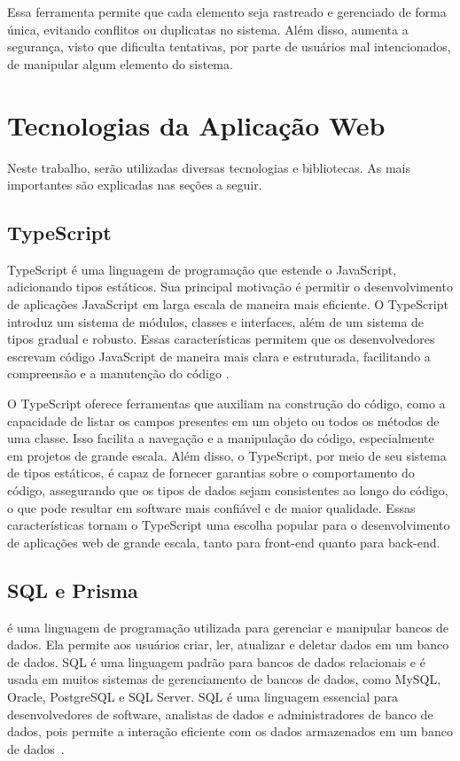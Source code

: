 Essa ferramenta permite que cada elemento seja rastreado e gerenciado de forma única, evitando conflitos ou duplicatas no sistema. Além disso, aumenta a segurança, visto que dificulta tentativas, por parte de usuários mal intencionados, de manipular algum elemento do sistema.

\section{Tecnologias da Aplicação Web}

Neste trabalho, serão utilizadas diversas tecnologias e bibliotecas. As mais importantes são explicadas nas seções a seguir. 

\subsection{TypeScript}

TypeScript é uma linguagem de programação que estende o JavaScript, adicionando tipos estáticos. Sua principal motivação é permitir o desenvolvimento de aplicações JavaScript em larga escala de maneira mais eficiente. O TypeScript introduz um sistema de módulos, classes e interfaces, além de um sistema de tipos gradual e robusto. Essas características permitem que os desenvolvedores escrevam código JavaScript de maneira mais clara e estruturada, facilitando a compreensão e a manutenção do código \cite[p.~257]{Bierman:2014}.

O TypeScript oferece ferramentas que auxiliam na construção do código, como a capacidade de listar os campos presentes em um objeto ou todos os métodos de uma classe. Isso facilita a navegação e a manipulação do código, especialmente em projetos de grande escala. Além disso, o TypeScript, por meio de seu sistema de tipos estáticos, é capaz de fornecer garantias sobre o comportamento do código, assegurando que os tipos de dados sejam consistentes ao longo do código, o que pode resultar em software mais confiável e de maior qualidade. Essas características tornam o TypeScript uma escolha popular para o desenvolvimento de aplicações web de grande escala, tanto para front-end quanto para back-end.

\subsection{SQL e Prisma}

 é uma linguagem de programação utilizada para gerenciar e manipular bancos de dados. Ela permite aos usuários criar, ler, atualizar e deletar dados em um banco de dados. SQL é uma linguagem padrão para bancos de dados relacionais e é usada em muitos sistemas de gerenciamento de bancos de dados, como MySQL, Oracle, PostgreSQL e SQL Server. SQL é uma linguagem essencial para desenvolvedores de software, analistas de dados e administradores de banco de dados, pois permite a interação eficiente com os dados armazenados em um banco de dados~\cite{SQL2023}.

